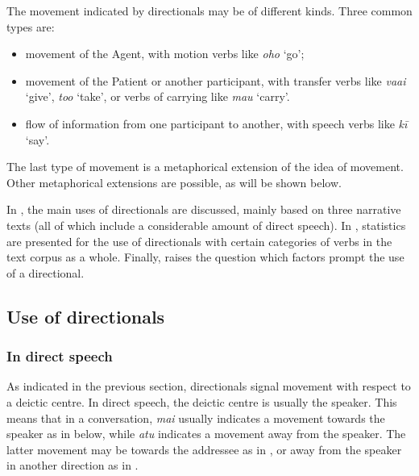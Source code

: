 The movement indicated by directionals may be of different kinds. Three common types are:

\begin{itemize}
\item 
movement of the Agent, with motion verbs like \textit{oho} ‘go’;

\item 
movement of the Patient or another participant, with transfer verbs like \textit{va{\ꞌ}ai} ‘give’, \textit{to{\ꞌ}o} ‘take’, or verbs of carrying like \textit{ma{\ꞌ}u} ‘carry’.

\item 
flow of information from one participant to another, with speech verbs like \textit{kī} ‘say’.

\end{itemize}

The last type of movement is a metaphorical extension of the idea of movement. Other metaphorical extensions are possible, as will be shown below.

In , the main uses of directionals are discussed, mainly based on three narrative texts (all of which include a considerable amount of direct speech). In , statistics are presented for the use of directionals with certain categories of verbs in the text corpus as a whole. Finally,  raises the question which factors prompt the use of a directional.

\subsection{Use of directionals}\label{sec:7.5.1}
\subsubsection[In direct speech]{In direct speech}\label{sec:7.5.1.1}

As indicated in the previous section, directionals signal movement with respect to a deictic centre. In direct speech, the deictic centre is usually the speaker. This means that in a conversation, \textit{mai} usually indicates a movement towards the speaker as in  below, while \textit{atu} indicates a movement away from the speaker. The latter movement may be towards the addressee as in , or away from the speaker in another direction as in .

